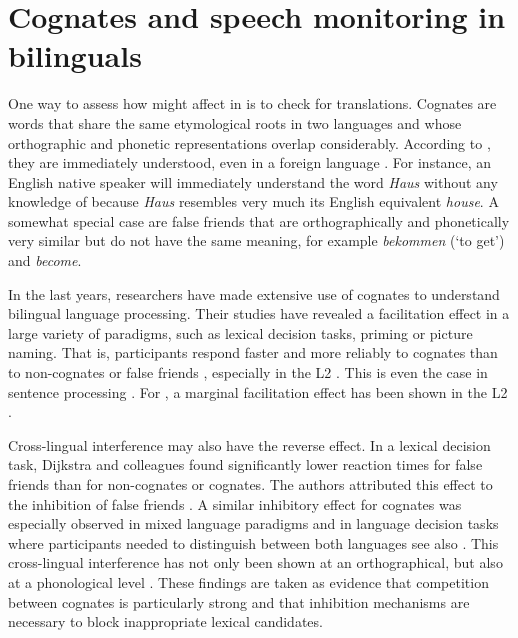 \documentclass[output=paper]{LSP/langsci}
\begin{document}
\section{Cognates and speech monitoring in bilinguals}
\largerpage
One way to assess how  might affect  in  is to check for  translations. Cognates are words that share the same etymological roots in two languages and whose orthographic and phonetic representations overlap considerably. According to \citet{Paradis2004}, they are immediately understood, even in a foreign language \citep{Paradis2004}. For instance, an English native speaker will immediately understand the  word \textit{Haus} without any knowledge of  because \textit{Haus} resembles very much its English equivalent \textit{house}. A somewhat special case are false friends that are orthographically and phonetically very similar but do not have the same meaning, for example \textit{bekommen} (`to get') and \textit{become}. 

In the last years, researchers have made extensive use of cognates to understand bilingual language processing. Their studies have revealed a  facilitation effect in a large variety of paradigms, such as lexical decision tasks, priming or picture naming. That is, participants respond faster and more reliably to cognates than to non-cognates or false friends \citep{Peeters2013, Christoffels2007, Costa2005, Christoffels2003, Dijkstra1999, vanHell1998, deGroot1991}, especially in the L2 \citep{Starreveld2015}. This is even the case in sentence processing \citep{vanAssche2011, vanAssche2009, Schwartz2006}. For , a marginal  facilitation effect has been shown in the L2 \citep{Dong2013}. 

Cross-lingual interference may also have the reverse effect. In a lexical decision task, Dijkstra and colleagues found significantly lower reaction times for false friends than for non-cognates or cognates. The authors attributed this effect to the inhibition of false friends \citep{Dijkstra1999}. A similar inhibitory effect for cognates was especially observed in mixed language paradigms and in language decision tasks where participants needed to distinguish between both languages \citep{Dijkstra2015, Acheson2012, Dijkstra2010, Dijkstra1998} see also \citet{Christoffels2007}. This cross-lingual interference has not only been shown at an orthographical, but also at a phonological level \citep{Costa2003, Jared2001}. These findings are taken as evidence that competition between cognates is particularly strong and that inhibition mechanisms are necessary to block inappropriate lexical candidates.
\end{document}

